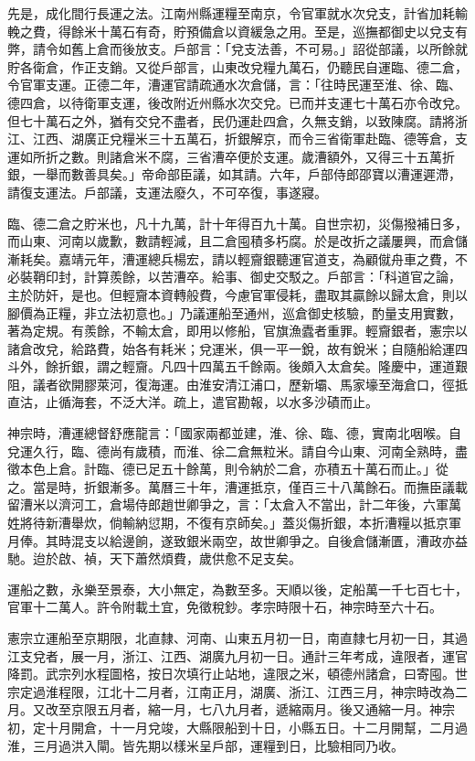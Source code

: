 先是，成化間行長運之法。江南州縣運糧至南京，令官軍就水次兌支，計省加耗輸輓之費，得餘米十萬石有奇，貯預備倉以資緩急之用。至是，巡撫都御史以兌支有弊，請令如舊上倉而後放支。戶部言：「兌支法善，不可易。」詔從部議，以所餘就貯各衛倉，作正支銷。又從戶部言，山東改兌糧九萬石，仍聽民自運臨、德二倉，令官軍支運。正德二年，漕運官請疏通水次倉儲，言：「往時民運至淮、徐、臨、德四倉，以待衛軍支運，後改附近州縣水次交兌。已而并支運七十萬石亦令改兌。但七十萬石之外，猶有交兌不盡者，民仍運赴四倉，久無支銷，以致陳腐。請將浙江、江西、湖廣正兌糧米三十五萬石，折銀解京，而令三省衛軍赴臨、德等倉，支運如所折之數。則諸倉米不腐，三省漕卒便於支運。歲漕額外，又得三十五萬折銀，一舉而數善具矣。」帝命部臣議，如其請。六年，戶部侍郎邵寶以漕運遲滯，請復支運法。戶部議，支運法廢久，不可卒復，事遂寢。

臨、德二倉之貯米也，凡十九萬，計十年得百九十萬。自世宗初，災傷撥補日多，而山東、河南以歲歉，數請輕減，且二倉囤積多朽腐。於是改折之議屢興，而倉儲漸耗矣。嘉靖元年，漕運總兵楊宏，請以輕齎銀聽運官道支，為顧僦舟車之費，不必裝鞘印封，計算羨餘，以苦漕卒。給事、御史交駁之。戶部言：「科道官之論，主於防奸，是也。但輕齎本資轉般費，今慮官軍侵耗，盡取其贏餘以歸太倉，則以腳價為正糧，非立法初意也。」乃議運船至通州，巡倉御史核驗，酌量支用實數，著為定規。有羨餘，不輸太倉，即用以修船，官旗漁蠹者重罪。輕齎銀者，憲宗以諸倉改兌，給路費，始各有耗米；兌運米，俱一平一銳，故有銳米；自隨船給運四斗外，餘折銀，謂之輕齎。凡四十四萬五千餘兩。後頗入太倉矣。隆慶中，運道艱阻，議者欲開膠萊河，復海運。由淮安清江浦口，歷新壩、馬家壕至海倉口，徑抵直沽，止循海套，不泛大洋。疏上，遣官勘報，以水多沙磧而止。

神宗時，漕運總督舒應龍言：「國家兩都並建，淮、徐、臨、德，實南北咽喉。自兌運久行，臨、德尚有歲積，而淮、徐二倉無粒米。請自今山東、河南全熟時，盡徵本色上倉。計臨、德已足五十餘萬，則令納於二倉，亦積五十萬石而止。」從之。當是時，折銀漸多。萬曆三十年，漕運抵京，僅百三十八萬餘石。而撫臣議載留漕米以濟河工，倉場侍郎趙世卿爭之，言：「太倉入不當出，計二年後，六軍萬姓將待新漕舉炊，倘輸納愆期，不復有京師矣。」蓋災傷折銀，本折漕糧以抵京軍月俸。其時混支以給邊餉，遂致銀米兩空，故世卿爭之。自後倉儲漸匱，漕政亦益馳。迨於啟、禎，天下蕭然煩費，歲供愈不足支矣。

運船之數，永樂至景泰，大小無定，為數至多。天順以後，定船萬一千七百七十，官軍十二萬人。許令附載土宜，免徵稅鈔。孝宗時限十石，神宗時至六十石。

憲宗立運船至京期限，北直隸、河南、山東五月初一日，南直隸七月初一日，其過江支兌者，展一月，浙江、江西、湖廣九月初一日。通計三年考成，違限者，運官降罰。武宗列水程圖格，按日次填行止站地，違限之米，頓德州諸倉，曰寄囤。世宗定過淮程限，江北十二月者，江南正月，湖廣、浙江、江西三月，神宗時改為二月。又改至京限五月者，縮一月，七八九月者，遞縮兩月。後又通縮一月。神宗初，定十月開倉，十一月兌竣，大縣限船到十日，小縣五日。十二月開幫，二月過淮，三月過洪入閘。皆先期以樣米呈戶部，運糧到日，比驗相同乃收。

